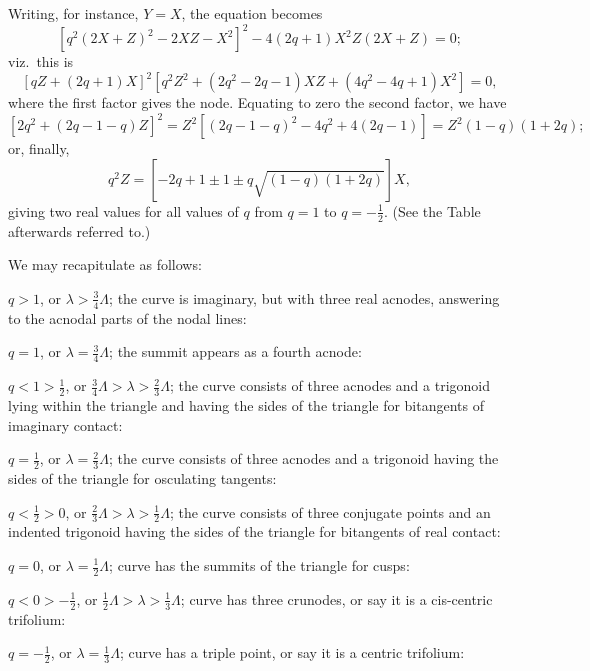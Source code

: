 \documentclass[11pt,a4paper]{book}
\begin{document}
Writing, for instance, $Y = X$, the equation becomes
\[
[q^2(2X + Z)^2 - 2XZ - X^2]^2 - 4(2q + 1)X^2Z(2X + Z) = 0;
\]
viz.\ this is
\[
[qZ + (2q + 1)X]^2[q^2Z^2 + (2q^2 - 2q - 1)XZ + (4q^2 - 4q + 1)X^2] = 0,
\]
where the first factor gives the node. Equating to zero the second factor, we have
\[
[2q^2 + (2q - 1 - q)Z]^2 = Z^2[(2q - 1 - q)^2 - 4q^2 + 4(2q - 1)] = Z^2(1 - q)(1 + 2q);
\]
or, finally,
\[
q^2Z = [-2q + 1 \pm 1 \pm q\sqrt{(1 - q)(1 + 2q)}]X,
\]
giving two real values for all values of $q$ from $q = 1$ to $q = -\tfrac{1}{2}$. (See the Table afterwards referred to.)

\newpage
\setcounter{page}{4}

We may recapitulate as follows:

\smallskip

$q > 1$, or $\lambda > \tfrac{3}{4}\Lambda$; the curve is imaginary, but with three real acnodes, answering to the acnodal parts of the nodal lines:

\smallskip

$q = 1$, or $\lambda = \tfrac{3}{4}\Lambda$; the summit appears as a fourth acnode:

\smallskip

$q < 1 > \tfrac{1}{2}$, or $\tfrac{3}{4}\Lambda > \lambda > \tfrac{2}{3}\Lambda$; the curve consists of three acnodes and a trigonoid lying within the triangle and having the sides of the triangle for bitangents of imaginary contact:

\smallskip

$q = \tfrac{1}{2}$, or $\lambda = \tfrac{2}{3}\Lambda$; the curve consists of three acnodes and a trigonoid having the sides of the triangle for osculating tangents:

\smallskip

$q < \tfrac{1}{2} > 0$, or $\tfrac{2}{3}\Lambda > \lambda > \tfrac{1}{2}\Lambda$; the curve consists of three conjugate points and an indented trigonoid having the sides of the triangle for bitangents of real contact:

\smallskip

$q = 0$, or $\lambda = \tfrac{1}{2}\Lambda$; curve has the summits of the triangle for cusps:

\smallskip

$q < 0 > -\tfrac{1}{2}$, or $\tfrac{1}{2}\Lambda > \lambda > \tfrac{1}{3}\Lambda$; curve has three crunodes, or say it is a cis-centric trifolium:

\smallskip

$q = -\tfrac{1}{2}$, or $\lambda = \tfrac{1}{3}\Lambda$; curve has a triple point, or say it is a centric trifolium:
\end{document}
